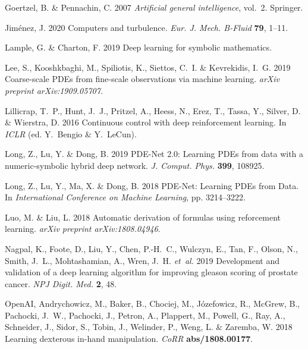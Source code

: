 \documentclass{article}
\begin{document}
\begin{thebibliography}{30}
{\sc Goertzel, B. \& Pennachin, C.} 2007 {\em Artificial general
  intelligence\/}, vol.~2. Springer.

{\sc Jim\'enez, J.} 2020 Computers and turbulence. {\em Eur. J. Mech. B-Fluid\/} {\bf 79}, 1--11.

{\sc Lample, G. \& Charton, F.} 2019 Deep learning for symbolic mathematics.

{\sc Lee, S., Kooshkbaghi, M., Spiliotis, K., Siettos, C.~I. \& Kevrekidis,
  I.~G.} 2019 {Coarse-scale PDEs from fine-scale observations via machine
  learning}. {\em arXiv preprint arXiv:1909.05707\/}.

{\sc Lillicrap, T.~P., Hunt, J.~J., Pritzel, A., Heess, N., Erez, T., Tassa,
  Y., Silver, D. \& Wierstra, D.} 2016 Continuous control with deep
  reinforcement learning. In {\em ICLR\/} (ed. Y.~Bengio \& Y.~LeCun).

{\sc Long, Z., Lu, Y. \& Dong, B.} 2019 {PDE-Net 2.0: Learning PDEs from data
  with a numeric-symbolic hybrid deep network}. {\em J. Comput. Phys.\/} {\bf 399}, 108925.

{\sc Long, Z., Lu, Y., Ma, X. \& Dong, B.} 2018 {PDE-Net: Learning PDEs from
  Data}. In {\em International Conference on Machine Learning\/}, pp.
  3214--3222.

{\sc Luo, M. \& Liu, L.} 2018 Automatic derivation of formulas using
  reforcement learning. {\em arXiv preprint arXiv:1808.04946\/}.

{\sc Nagpal, K., Foote, D., Liu, Y., Chen, P.-H.~C., Wulczyn, E., Tan, F.,
  Olson, N., Smith, J.~L., Mohtashamian, A., Wren, J.~H. {\em et~al.\/}} 2019
  Development and validation of a deep learning algorithm for improving gleason
  scoring of prostate cancer. {\em NPJ Digit. Med.\/} {\bf 2}, 48.

{\sc OpenAI, Andrychowicz, M., Baker, B., Chociej, M., J{\'{o}}zefowicz, R.,
  McGrew, B., Pachocki, J.~W., Pachocki, J., Petron, A., Plappert, M., Powell,
  G., Ray, A., Schneider, J., Sidor, S., Tobin, J., Welinder, P., Weng, L. \&
  Zaremba, W.} 2018 Learning dexterous in-hand manipulation. {\em CoRR\/} {\bf
  abs/1808.00177}.


\end{thebibliography}
\end{document}

